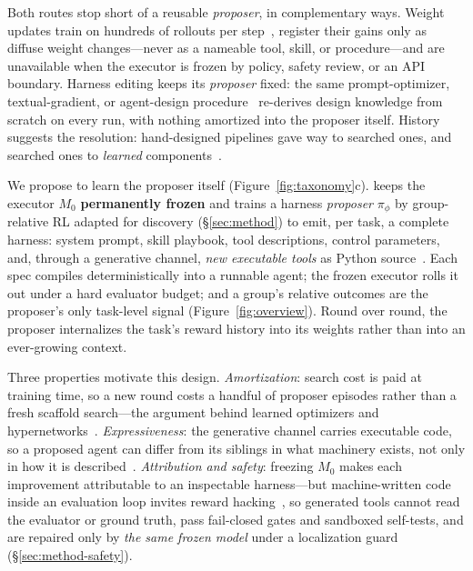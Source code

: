 Both routes stop short of a reusable \emph{proposer}, in complementary ways.
Weight updates train on hundreds of rollouts per
step~\citep{tttdiscover,thetaevolve}, register their gains only as diffuse
weight changes---never as a nameable tool, skill, or procedure---and are
unavailable when the executor is frozen by policy, safety review, or an API
boundary.  Harness editing keeps its \emph{proposer} fixed: the same
prompt-optimizer, textual-gradient, or agent-design
procedure~\citep{ape,opro,promptbreeder,evoprompt,mipro,metaprompting,dspy,
textgrad,trace,gepa,adas,aflow,agentsquare,agentsymbolic} re-derives design
knowledge from scratch on every run, with nothing amortized into the
proposer itself.  History suggests the resolution: hand-designed pipelines
gave way to searched ones, and searched ones to \emph{learned}
components~\citep{learn2learn,hypernetworks,adas}.

We propose to learn the proposer itself (Figure~\ref{fig:taxonomy}c).
\method{} keeps the executor $M_0$ \textbf{permanently frozen} and trains a
harness \emph{proposer} $\pi_\phi$ by group-relative RL adapted for
discovery (\S\ref{sec:method}) to emit, per task, a complete harness:
system prompt, skill playbook, tool descriptions, control parameters, and,
through a generative channel, \emph{new executable tools} as Python
source~\citep{latm,creator,craft,voyager,trove}.  Each spec compiles
deterministically into a runnable agent; the frozen executor rolls it out
under a hard evaluator budget; and a group's relative outcomes are the
proposer's only task-level signal (Figure~\ref{fig:overview}).  Round over
round, the proposer internalizes the task's reward history into its weights
rather than into an ever-growing context.

Three properties motivate this design.  \emph{Amortization}: search cost
is paid at training time, so a new round costs a handful of proposer
episodes rather than a fresh scaffold search---the argument behind learned
optimizers and hypernetworks~\citep{learn2learn,hypernetworks}.
\emph{Expressiveness}: the generative channel carries executable code, so a
proposed agent can differ from its siblings in what machinery exists, not
only in how it is described~\citep{adas,latm,voyager}.  \emph{Attribution
and safety}: freezing $M_0$ makes each improvement attributable to an
inspectable harness---but machine-written code inside an evaluation loop
invites reward hacking~\citep{skalse2022,specgaming,denison2024,baker2025,
metr2025,impossiblebench}, so generated tools cannot read the evaluator or
ground truth, pass fail-closed gates and sandboxed self-tests, and are
repaired only by \emph{the same frozen model} under a localization guard
(\S\ref{sec:method-safety}).


